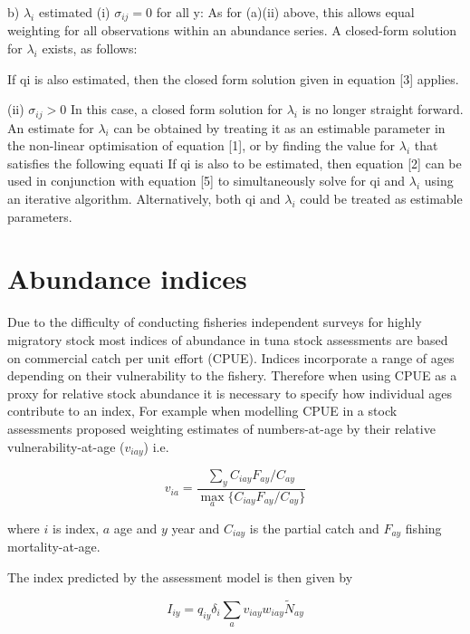 \documentclass[a4paper,10pt]{article}
\begin{document}
b) $\lambda_{i}$ estimated
(i) $\sigma_{ij} = 0$ for all y:
As for (a)(ii) above, this allows equal weighting for all observations within an abundance series. A closed-form solution for $\lambda_{i}$ exists, as follows:
		
If qi is also estimated, then the closed form solution given in equation [3] applies.

(ii)	$\sigma_{ij} > 0$
In this case, a closed form solution for $\lambda_{i}$ is no longer straight forward. An estimate for $\lambda_{i}$ can be obtained by treating it as an estimable parameter in the non-linear optimisation of equation [1], or by finding the value for $\lambda_{i}$ that satisfies the following equati If qi is also to be estimated, then equation [2] can be used in conjunction with equation [5] to simultaneously solve for qi and $\lambda_{i}$ using an iterative algorithm. Alternatively, both qi and $\lambda_{i}$ could be treated as estimable parameters.

\section{Abundance indices}

Due to the difficulty of conducting fisheries independent surveys for highly migratory stock most indices of abundance in tuna stock assessments are based on commercial catch per unit effort (CPUE). Indices incorporate a range of ages depending on their vulnerability to the fishery. Therefore when using CPUE as a proxy for relative stock abundance it is necessary to specify how individual ages contribute to an index, For example when modelling CPUE in a stock assessments  \cite{butterworth1999some} proposed weighting estimates of numbers-at-age by their relative vulnerability-at-age ($v_{iay}$) i.e.   

\begin{equation}\label{eq1}
v_{ia}=\frac{\sum_y C_{iay}F_{ay}/C_{ay}}{  \max\limits_{a} \{C_{iay}F_{ay}/C_{ay} \}}
\end{equation}

where $i$ is index, $a$ age and $y$ year and $C_{iay}$ is the partial catch and $F_{ay}$ fishing mortality-at-age.

The index predicted by the assessment model is then given by

\begin{equation}\label{eq2}
I_{iy}=q_{iy} \delta_{i} \sum_a v_{iay} w_{iay} \tilde{N}_{ay}
\end{equation}
\end{document}
